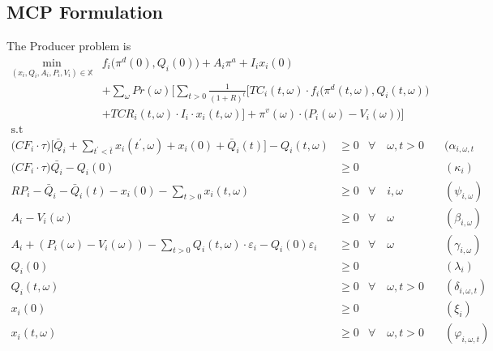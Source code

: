 \documentclass[11pt, letterpaper]{article}
\begin{document}
\newpage
\begin{appendices}
\appendix
\section{MCP Formulation}\label{ap:mcp}
\setcounter{equation}{0}
The Producer problem is 
\begin{align}
\min_{(x_i,Q_i,A_i,P_i,V_i)\in \mathbb{X}} &  f_i \big( \pi^d(0),Q_i(0)\big)+ A_i \pi^{a} + I_i x_i(0) \nonumber \\ 
& + \sum_{\omega} Pr(\omega)   \Bigg[ \sum_{t>0} \frac{1}{(1+R)^t} \Big[ TC_i(t,\omega)\cdot f_i \big( \pi^d(t,\omega),Q_i(t,\omega) \big)  \nonumber \\
 & + TCR_i(t,\omega) \cdot I_i\cdot x_i(t,\omega) \Big] + \pi^v(\omega)\cdot \big(P_i(\omega)-V_i(\omega)\big) \Bigg]  \\
     \textrm{s.t \ } \nonumber
\end{align}
\begin{align}
    \Big(CF_i \cdot\tau\Big)  \Bigg[\bar{Q}_i + \sum_{t^{\prime}<\bar{t}} x_i(t^\prime,\omega) + x_i(0)+ \bar{Q}_i(t) \Bigg] - Q_i(t,\omega) & \geq 0  & \forall  \quad \omega, t  > 0 & \quad (\alpha_{i,\omega,t}\\
    \Big(CF_i\cdot\tau \Big)\bar{Q_i}-Q_{i}(0) & \geq 0  &  \quad & \quad (\kappa_i) \\
     RP_i - \bar{Q}_i - \bar{Q}_i(t) - x_i(0) - \sum_{t > 0} x_i(t,\omega) & \geq 0 &  \forall \quad i,\omega &   \quad (\psi_{i,\omega}) \\
 A_{i} -V_i(\omega) & \geq  0  & \forall  \quad \omega & \quad (\beta_{i,\omega}) \\
 A_{i} + (P_i(\omega) - V_i(\omega))-\sum_{t>0}Q_i(t, \omega)\cdot \varepsilon_{i}-Q_i(0)\varepsilon_{i} & \geq  0  &\forall \quad \omega & \quad (\gamma_{i,\omega})\\
 Q_i(0) & \geq  0 & \quad & \quad (\lambda_i)\\
 Q_i(t, \omega) & \geq  0   & \forall  \quad \omega, t >0 & \quad (\delta_{i,\omega,t})\\
  x_i(0) & \geq  0 & \quad & \quad (\xi_i)\\
  x_i(t, \omega) & \geq  0   & \forall  \quad \omega, t >0 & \quad (\varphi_{i,\omega,t})
  \end{align}
  

\end{appendices}
\end{document}

